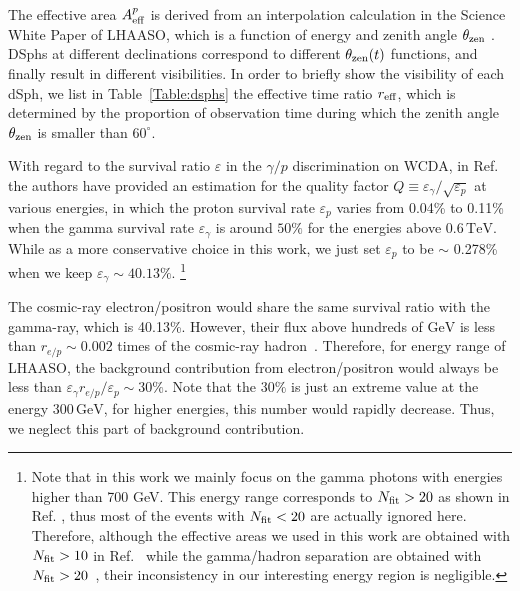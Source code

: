 \documentclass[12pt,aps,prd,amsmath,amssymb,showpacs,floats,floatfix,nofootinbib]{revtex4-1}
\def\TeV{\mathrm{TeV}} %
\def\GeV{\mathrm{GeV}} %
\begin{document}
The effective area $A_{\rm eff}^{p}$ is derived from an interpolation calculation in the Science White Paper of LHAASO, which is a function of energy and zenith angle $\theta_{\rm zen}$ \cite{Bai:2019khm}.
DSphs at different declinations correspond to different $\theta_{\rm zen}(t)$ functions, and finally result in different visibilities. In order to briefly show the visibility of each dSph, we list in Table~\ref{Table:dsphs} the effective time ratio $r_{\rm eff}$, which is determined by the proportion of observation time during which the zenith angle $\theta_{\rm zen}$ is smaller than $60^\circ$.

With regard to the survival ratio $\varepsilon$ in the $\gamma/p$ discrimination on WCDA,
in Ref.~\cite{Zha:2017vcs} the authors have provided an estimation for the quality factor $Q\equiv\varepsilon_{\gamma}/\sqrt{\varepsilon_{p}}$ at various energies, in which the proton survival rate $\varepsilon_{p}$ varies from 0.04\% to 0.11\% when the gamma survival rate $\varepsilon_{\gamma}$ is around $50\%$ for the energies above $0.6\,\TeV$. While as a more conservative choice in this work, we just set $\varepsilon_{p}$ to be $\sim$ 0.278\% when we keep $\varepsilon_{\gamma} \sim40.13\%$.
\footnote{Note that in this work we mainly focus on the gamma photons with energies higher than 700 GeV.
    This energy range corresponds to $N_{\rm fit} > 20$ as shown in Ref. \cite{Zha:2017vcs}, thus most of the events with $N_{\rm fit} < 20$ are actually ignored here.
    Therefore, although the effective areas we used in this work are obtained with $N_{\rm fit} > 10$ in Ref.~\cite{Bai:2019khm} while the gamma/hadron separation are obtained with $N_{\rm fit}>20$~\cite{Zha:2017vcs}, their inconsistency in our interesting energy region is negligible.
}


The cosmic-ray electron/positron would share the same survival ratio with the gamma-ray, which is 40.13\%.
However, their flux above hundreds of $\GeV$ is less than $r_{e/p}\sim0.002$ times of the cosmic-ray hadron~\cite{TheDAMPE:2017dtc,Aguilar:2015ooa}. Therefore, for energy range of LHAASO, the background contribution from electron/positron would always be less than $\varepsilon_{\gamma}r_{e/p}/\varepsilon_p\sim30\%$. Note that the $30\%$ is just an extreme value at the energy $300\,\GeV$, for higher energies, this number would rapidly decrease. Thus, we neglect this part of background contribution.
\end{document}
